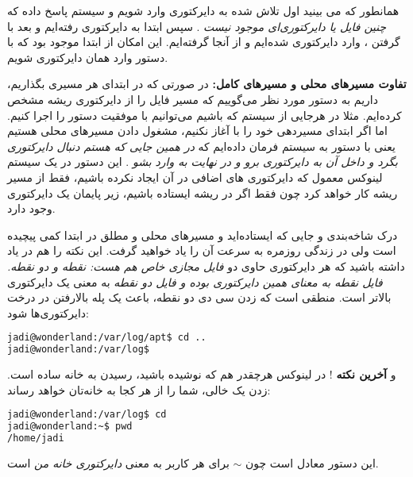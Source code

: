 همانطور که می بینید اول تلاش شده به دایرکتوری 
 وارد شویم و سیستم پاسخ داده که
\emph{چنین فایل یا دایرکتوری‌ای موجود نیست}
. سپس ابتدا به دایرکتوری 
 رفته‌ایم و بعد با گرفتن ، وارد دایرکتوری 
 شده‌ایم و از آنجا  گرفته‌ایم. این امکان از ابتدا موجود بود که با دستور
وارد همان دایرکتوری شویم.

\textbf{تفاوت مسیرهای محلی و مسیرهای کامل:}
در صورتی که در ابتدای هر مسیری \lr{/} بگذاریم، داریم به دستور مورد نظر می‌گوییم که مسیر فایل را از دایرکتوری ریشه مشخص کرده‌ایم. مثلا در هرجایی از سیستم که باشیم می‌توانیم با موفقیت دستور
را اجرا کنیم. 
اما اگر ابتدای مسیردهی خود را با 
\lr{/}
آغاز نکنیم، مشغول دادن مسیرهای محلی هستیم یعنی با دستور
به سیستم فرمان داده‌ایم که
\emph{در همین جایی که هستم دنبال دایرکتوری 
 بگرد و داخل آن به دایرکتوری 
 برو و در نهایت به 
 وارد بشو}
. این دستور در یک سیستم لینوکس معمول که دایرکتوری های اضافی در آن ایجاد نکرده باشیم، فقط از مسیر ریشه کار خواهد کرد چون فقط اگر در ریشه ایستاده باشیم، زیر پایمان یک دایرکتوری 
 وجود دارد.
 
درک شاخه‌بندی و جایی که ایستاده‌اید و مسیرهای محلی و مطلق در ابتدا کمی پیچیده است ولی در زندگی روزمره به سرعت آن را یاد خواهید گرفت. این نکته را هم در یاد داشته باشید که هر دایرکتوری حاوی دو
\emph{فایل مجازی خاص هم هست: نقطه و دو نقطه. فایل نقطه به معنای همین دایرکتوری بوده و فایل دو نقطه}
به معنی یک دایرکتوری بالاتر است. منطقی است که زدن سی دی دو نقطه، باعث یک پله بالارفتن در درخت دایرکتوری‌ها شود:

\begin{latin}
\begin{lstlisting}[language=bash,basicstyle=\ttfamily,linewidth=12cm]
jadi@wonderland:/var/log/apt$ cd ..
jadi@wonderland:/var/log$ 
\end{lstlisting}
\end{latin}

و
\textbf{آخرین نکته}
‌! در لینوکس هرچقدر هم که نوشیده باشید، رسیدن به خانه ساده است. زدن یک  خالی، شما را از هر کجا به خانه‌تان خواهد رساند:

\begin{latin}
\begin{lstlisting}[language=bash,basicstyle=\ttfamily,linewidth=12cm]
jadi@wonderland:/var/log$ cd
jadi@wonderland:~$ pwd
/home/jadi
\end{lstlisting}
\end{latin}

\و این دستور معادل
است چون $\sim$ برای هر کاربر به معنی
\emph{دایرکتوری خانه من}
است.

